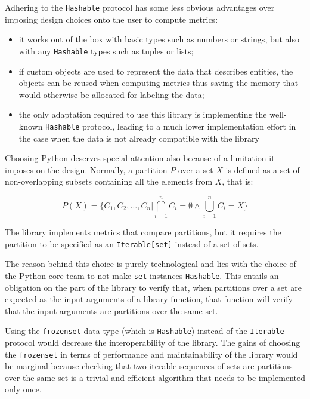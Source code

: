 \documentclass[a4paper,twoside]{article}
\begin{document}
    Adhering to the \texttt{Hashable} protocol has some less obvious advantages
    over imposing design choices onto the user to compute metrics:
    \begin{itemize}
        \item it works out of the box with basic types such as numbers or
        strings, but also with any \texttt{Hashable} types such as tuples or
        lists;
        \item if custom objects are used to represent the data that describes
        entities, the objects can be reused when computing metrics thus saving
        the memory that would otherwise be allocated for labeling the data;
        \item the only adaptation required to use this library is implementing
        the well-known \texttt{Hashable} protocol, leading to a much lower
        implementation effort in the case when the data is not already
        compatible with the library\@
    \end{itemize}

    Choosing Python deserves special attention also because of a limitation it
    imposes on the design.
    Normally, a partition $P$ over a set $X$ is defined as a set of
    non-overlapping subsets containing all the elements from $X$, that is:

    \[
        P(X) = \{ C_1, C_2, \ldots, C_n | \bigcap\limits^n_{i=1}C_i=\emptyset \land \bigcup\limits^n_{i=1}C_i=X \}
    \]

    The library implements metrics that compare partitions, but it requires the
    partition to be specified as an \texttt{Iterable[set]} instead of a set of
    sets.

    The reason behind this choice is purely technological and lies with the
    choice of the Python core team to not make \texttt{set} instances
    \texttt{Hashable}.
    This entails an obligation on the part of the library to verify that, when
    partitions over a set are expected as the input arguments of a library
    function, that function will verify that the input arguments are partitions
    over the same set.

    Using the \texttt{frozenset} data type (which is \texttt{Hashable}) instead
    of the \texttt{Iterable} protocol would decrease the interoperability of the
    library.
    The gains of choosing the \texttt{frozenset} in terms of performance and
    maintainability of the library would be marginal because checking that two
    iterable sequences of sets are partitions over the same set is a trivial and
    efficient algorithm that needs to be implemented only once.
\end{document}

